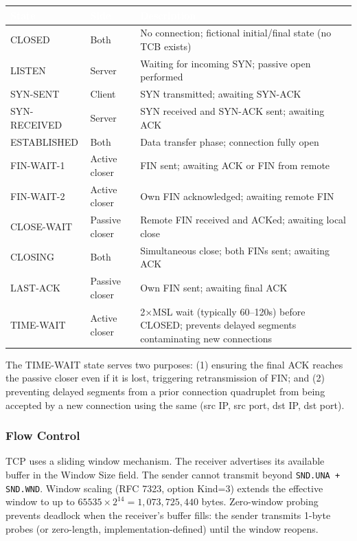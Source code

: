 \documentclass[11pt,letterpaper]{article}
\newcommand{\tableheader}[1]{\textbf{\sffamily\textcolor{white}{#1}}}
\begin{document}
\begin{center}
\begin{tabularx}{\textwidth}{L{2.8cm}L{2.2cm}X}
\toprule
{}
\tableheader{State} & \tableheader{Side} & \tableheader{Description} \\
\midrule
CLOSED & Both & No connection; fictional initial/final state (no TCB exists) \\
LISTEN & Server & Waiting for incoming SYN; passive open performed \\
SYN-SENT & Client & SYN transmitted; awaiting SYN-ACK \\
SYN-RECEIVED & Server & SYN received and SYN-ACK sent; awaiting ACK \\
ESTABLISHED & Both & Data transfer phase; connection fully open \\
FIN-WAIT-1 & Active closer & FIN sent; awaiting ACK or FIN from remote \\
FIN-WAIT-2 & Active closer & Own FIN acknowledged; awaiting remote FIN \\
CLOSE-WAIT & Passive closer & Remote FIN received and ACKed; awaiting local close \\
CLOSING & Both & Simultaneous close; both FINs sent; awaiting ACK \\
LAST-ACK & Passive closer & Own FIN sent; awaiting final ACK \\
TIME-WAIT & Active closer & 2×MSL wait (typically 60--120s) before CLOSED; prevents delayed segments contaminating new connections \\
\bottomrule
\end{tabularx}
\end{center}

The TIME-WAIT state serves two purposes: (1) ensuring the final ACK reaches the passive closer even if it is lost, triggering retransmission of FIN; and (2) preventing delayed segments from a prior connection quadruplet from being accepted by a new connection using the same (src IP, src port, dst IP, dst port).

\subsubsection{Flow Control}

TCP uses a sliding window mechanism. The receiver advertises its available buffer in the Window Size field. The sender cannot transmit beyond \texttt{SND.UNA + SND.WND}. Window scaling (RFC 7323, option Kind=3) extends the effective window to up to $65535 \times 2^{14} = 1{,}073{,}725{,}440$ bytes. Zero-window probing prevents deadlock when the receiver's buffer fills: the sender transmits 1-byte probes (or zero-length, implementation-defined) until the window reopens.
\end{document}
